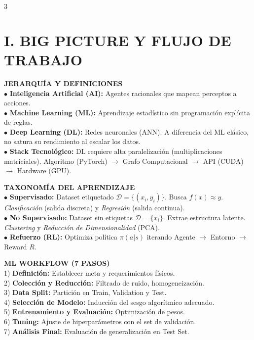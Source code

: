 \documentclass[8pt,a4paper,landscape,fleqn]{extarticle}
\begin{document}
\begin{multicols*}{3}
\scriptsize

\section{I. BIG PICTURE Y FLUJO DE TRABAJO}

\textbf{JERARQUÍA Y DEFINICIONES}\\
$\bullet$ \textbf{Inteligencia Artificial (AI):} Agentes racionales que mapean perceptos a acciones.\\
$\bullet$ \textbf{Machine Learning (ML):} Aprendizaje estadístico sin programación explícita de reglas.\\
$\bullet$ \textbf{Deep Learning (DL):} Redes neuronales (ANN). A diferencia del ML clásico, no satura su rendimiento al escalar los datos.\\
$\bullet$ \textbf{Stack Tecnológico:} DL requiere alta paralelización (multiplicaciones matriciales). Algoritmo (PyTorch) $\to$ Grafo Computacional $\to$ API (CUDA) $\to$ Hardware (GPU).

\textbf{TAXONOMÍA DEL APRENDIZAJE}\\
$\bullet$ \textbf{Supervisado:} Dataset etiquetado $\mathcal{D} = \{(x_i, y_i)\}$. Busca $f(x) \approx y$. \textit{Clasificación} (salida discreta) y \textit{Regresión} (salida continua).\\
$\bullet$ \textbf{No Supervisado:} Dataset sin etiquetas $\mathcal{D} = \{x_i\}$. Extrae estructura latente. \textit{Clustering} y \textit{Reducción de Dimensionalidad} (PCA).\\
$\bullet$ \textbf{Refuerzo (RL):} Optimiza política $\pi(a|s)$ iterando Agente $\to$ Entorno $\to$ Reward $R$.

\textbf{ML WORKFLOW (7 PASOS)}\\
1) \textbf{Definición:} Establecer meta y requerimientos físicos.\\
2) \textbf{Colección y Reducción:} Filtrado de ruido, homogeneización.\\
3) \textbf{Data Split:} Partición en Train, Validation y Test.\\
4) \textbf{Selección de Modelo:} Inducción del sesgo algorítmico adecuado.\\
5) \textbf{Entrenamiento y Evaluación:} Optimización de pesos.\\
6) \textbf{Tuning:} Ajuste de hiperparámetros con el set de validación.\\
7) \textbf{Análisis Final:} Evaluación de generalización en Test Set.


\end{multicols*}
\end{document}
